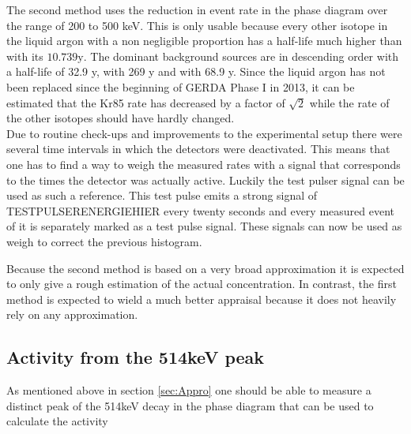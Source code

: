 The second method uses the reduction in event rate in the phase diagram over the range of 200 to 500 keV. This is only usable because every other isotope in the liquid argon with a non negligible proportion has a half-life much higher than  with its \(10.739\mathrm{y}\). The dominant background sources are in descending order  with a half-life of 32.9 y,  with 269 y and  with 68.9 y. Since the liquid argon has not been replaced since the beginning of GERDA Phase I in 2013, it can be estimated that the Kr85 rate has decreased by a factor of \(\sqrt{2}\) while the rate of the other isotopes should have hardly changed.\\

Due to routine check-ups and improvements to the experimental setup there were several time intervals in which the detectors were deactivated. This means that one has to find a way to weigh the measured rates with a signal that corresponds to the times the detector was actually active. Luckily the test pulser signal can be used as such a reference. This test pulse emits a strong signal of TESTPULSERENERGIEHIER every twenty seconds and every measured event of it is separately marked as a test pulse signal. These signals can now be used as weigh to correct the previous histogram.

Because the second method is based on a very broad approximation it is expected to only give a rough estimation of the actual concentration. In contrast, the first method is expected to wield a much better appraisal because it does not heavily rely on any approximation.

 
\subsection{Activity from the 514keV peak}
\label{sec:SAfrom514}

As mentioned above in section \ref{sec:Appro} one should be able to measure a distinct peak of the 514keV decay in the phase diagram that can be used to calculate the activity 

